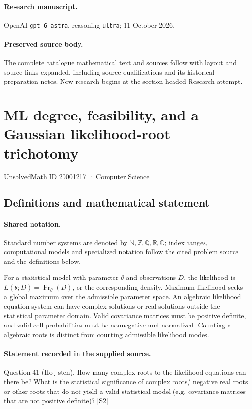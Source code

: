 \documentclass[11pt]{article}
\begin{document}
\paragraph{Research manuscript.} OpenAI \texttt{gpt-6-astra}, reasoning \texttt{ultra}; 11 October 2026.
\paragraph{Preserved source body.} The complete catalogue mathematical text and sources follow with layout and source links expanded, including source qualifications and its historical preparation notes. New research begins at the section headed Research attempt.

\section{ML degree, feasibility, and a Gaussian likelihood-root trichotomy}\label{20001217}
{\small UnsolvedMath ID 20001217 · Computer Science}
\subsection{Definitions and mathematical statement}

\paragraph{Shared notation.}Standard number systems are denoted by $\mathbb N,\mathbb Z,\mathbb Q,\mathbb R,\mathbb C$; index ranges, computational models and specialized notation follow the cited problem source and the definitions below.


For a statistical model with parameter $\theta$ and observations $D$, the likelihood is $L(\theta;D)=\Pr_\theta(D)$, or the corresponding density. Maximum likelihood seeks a global maximum over the admissible parameter space. An algebraic likelihood equation system can have complex solutions or real solutions outside the statistical parameter domain. Valid covariance matrices must be positive definite, and valid cell probabilities must be nonnegative and normalized. Counting all algebraic roots is distinct from counting admissible likelihood modes.
\paragraph{Statement recorded in the supplied source.}
Question 41 (Ho¸ sten). How many complex roots to the likelihood equations can there be? What is the statistical significance of complex roots/ negative real roots or other roots that do not yield a valid statistical model (e.g. covariance matrices that are not positive definite)? \href{https://aimath.org/WWN/compalgstat/compalgstat.pdf}{[S2]}
\end{document}
